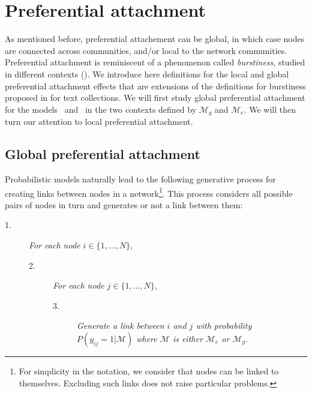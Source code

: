 \section{Preferential attachment}
\label{sec:burstiness}

As mentioned before, preferential attachement can be global, in which case nodes are connected across communities, and/or local to the network communities. Preferential attachment is reminiscent of a phenomenon called \textit{burstiness}, studied in different contexts (\cite{barabasi_burst}). We introduce here definitions for the local and global preferential attachment effects that are extensions of the definitions for burstiness proposed in \cite{clinchant2010information} for text collections. We will first study global preferential attachment for the models \ifm\ and \imb\ in the two contexts defined by $\mathcal{M}_g$ and $\mathcal{M}_e$. We will then turn our attention to local preferential attachment.

\subsection{Global preferential attachment}

Probabilistic models naturally lead to the following generative process for creating links between nodes in a network\footnote{For simplicity in the notation, we consider that nodes can be linked to themselves. Excluding such links does not raise particular problems.}. This process considers all possible pairs of nodes in turn and generates or not a link between them:

\begin{description}
 \item[1.] \textit{For each node $i \in \{1, \dotsc, N\}$},
 \begin{description}
    \item[2.] \textit{For each node $j \in \{1, \dotsc, N\}$},
       \begin{description}
          \item[3.] \textit{Generate a link between $i$ and $j$ with probability $P(y_{ij}=1 | \mathcal{M})$ where $\mathcal{M}$ is either $\mathcal{M}_e$ or $\mathcal{M}_g$}.
       \end{description}
  \end{description}
\end{description}

